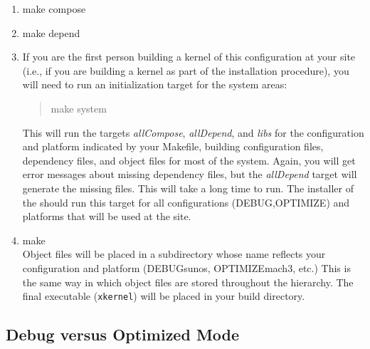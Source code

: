\begin{enumerate}
\smallskip

In steps \ref{en:make_compose}, \ref{en:make_depend}, and \ref{en:make_system},
you may see one or more compiler warning messages of the
form:

\begin{verbatim}
         make[n]: fopen: [filename]: No such file or directory
\end{verbatim}

These messages are expected and can be ignored.
The files referenced by these messages will be created in
steps \ref{en:make_depend} and \ref{en:make_system}.

The following
two steps must be redone if {\sanss graph.comp} is later modified:
\item{}
\label{en:make_compose}
{\sanss make compose}

\item{}
\label{en:make_depend}
{\sanss make depend} 

\item{}
\label{en:make_system}
If you are the first person building a kernel of this configuration at
your site (i.e., if you are building a kernel as part of the
installation procedure), you will need to run an initialization
target for the system areas:
\begin{quote}
{\sanss make system}
\end{quote}
This will run the targets {\em allCompose}, {\em allDepend}, and {\em
libs} for the configuration and platform indicated by your Makefile,
building configuration files, dependency files, and object files for
most of the \xk{} system.  Again, you will get error messages about
missing dependency files, but the {\em allDepend} target will generate
the missing files. 
This will take a long time to run.  The
installer of the \xk{} should run this target for all configurations
(DEBUG,OPTIMIZE) and platforms that will be used at the site.

\item{}
{\sanss make}
\\Object files will be placed in a subdirectory whose name reflects your
configuration and platform (DEBUGsunos, OPTIMIZEmach3, etc.)  This is
the same way in which object files are stored throughout the \xk{}
hierarchy.  The final \xk{} executable ({\tt xkernel}) will be placed
in your build directory. 

\end{enumerate}

\subsection{Debug versus Optimized Mode}

